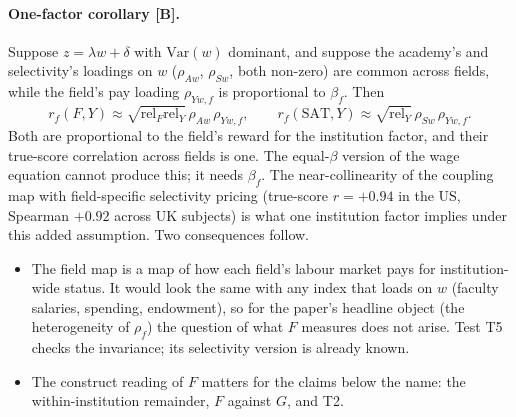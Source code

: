 \paragraph{One-factor corollary [B].} Suppose $z=\lambda w+\delta$ with $\mathrm{Var}(w)$ dominant, and suppose the
academy's and selectivity's loadings on $w$ ($\rho_{Aw}$, $\rho_{Sw}$, both non-zero) are common across fields,
while the field's pay loading $\rho_{Yw,f}$ is proportional to $\beta_f$. Then
\[
r_f(F,Y)\approx\sqrt{\mathrm{rel}_F\mathrm{rel}_Y}\,\rho_{Aw}\,\rho_{Yw,f},\qquad
r_f(\text{SAT},Y)\approx\sqrt{\mathrm{rel}_Y}\,\rho_{Sw}\,\rho_{Yw,f}.
\]
Both are proportional to the field's reward for the institution factor, and their true-score correlation across
fields is one. The equal-$\beta$ version of the wage equation cannot produce this; it needs $\beta_f$. The
near-collinearity of the coupling map with field-specific selectivity pricing (true-score $r=+0.94$ in the US,
Spearman $+0.92$ across UK subjects) is what one institution factor implies under this added assumption. Two
consequences follow.
\begin{itemize}
\item The field map is a map of how each field's labour market pays for institution-wide status. It would look
the same with any index that loads on $w$ (faculty salaries, spending, endowment), so for the paper's headline
object (the heterogeneity of $\rho_f$) the question of what $F$ measures does not arise. Test T5 checks the
invariance; its selectivity version is already known.
\item The construct reading of $F$ matters for the claims below the name: the within-institution remainder, $F$
against $G$, and T2.
\end{itemize}

